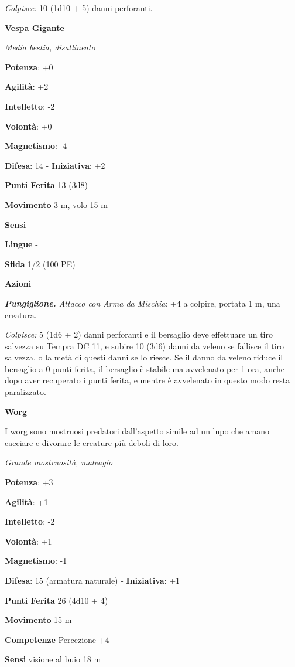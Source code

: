 \begin{multicols}{2}
\emph{Colpisce:} 10 (1d10 + 5) danni perforanti.

\textbf{Vespa Gigante}

\emph{Media bestia, disallineato}

\textbf{Potenza}: +0

\textbf{Agilità}: +2

\textbf{Intelletto}: -2

\textbf{Volontà}: +0

\textbf{Magnetismo}: -4

\textbf{Difesa}: 14 - \textbf{Iniziativa}: +2

\textbf{Punti Ferita} 13 (3d8)

\textbf{Movimento} 3 m, volo 15 m

\textbf{Sensi} 

\textbf{Lingue} -

\textbf{Sfida} 1/2 (100 PE)\smallskip

\smallskip\textbf{Azioni}

\emph{\textbf{Pungiglione.} Attacco con Arma da Mischia}: +4 a colpire,
portata 1 m, una creatura.

\emph{Colpisce:} 5 (1d6 + 2) danni perforanti e il bersaglio deve
effettuare un tiro salvezza su Tempra DC 11, e subire 10 (3d6)
danni da veleno se fallisce il tiro salvezza, o la metà di questi danni
se lo riesce. Se il danno da veleno riduce il bersaglio a 0 punti
ferita, il bersaglio è stabile ma avvelenato per 1 ora, anche dopo aver
recuperato i punti ferita, e mentre è avvelenato in questo modo resta
paralizzato.

\textbf{Worg}

I worg sono mostruosi predatori dall'aspetto simile ad un lupo che amano
cacciare e divorare le creature più deboli di loro.

\emph{Grande mostruosità, malvagio}

\textbf{Potenza}: +3

\textbf{Agilità}: +1

\textbf{Intelletto}: -2

\textbf{Volontà}: +1

\textbf{Magnetismo}: -1

\textbf{Difesa}: 15 (armatura naturale) - \textbf{Iniziativa}: +1

\textbf{Punti Ferita} 26 (4d10 + 4)

\textbf{Movimento} 15 m

\textbf{Competenze} Percezione +4

\textbf{Sensi} visione al buio 18 m


\end{multicols}
